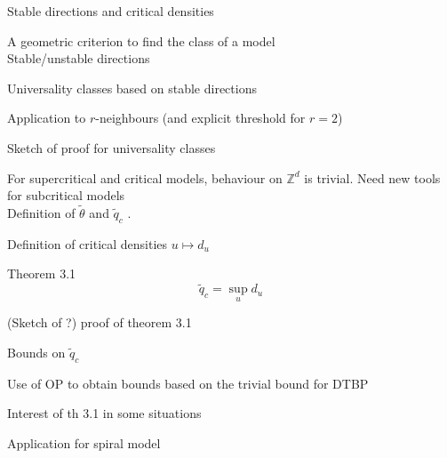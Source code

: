 \documentclass{beamer}
\begin{document}
\begin{section}{Stable directions and critical densities}
	\begin{frame}
		A geometric criterion to find the class of a model\\
		Stable/unstable directions\\
	\end{frame}
	\begin{frame}
		Universality classes based on stable directions
	\end{frame}
	\begin{frame}
		Application to $r$-neighbours (and explicit threshold for $r=2$)
	\end{frame}
	\begin{frame}
		Sketch of proof for universality classes
	\end{frame}
	\begin{frame}
		For supercritical and critical models, behaviour on $\mathbb{Z}^d$ is trivial. Need new tools for subcritical models\\
		Definition of $\tilde\theta $ and $  \tilde q_c $ .
	\end{frame}
	\begin{frame}
		Definition of critical densities $u\mapsto d_u$
	\end{frame}
	\begin{frame}
		\begin{theorem}{Theorem 3.1}
			$$\tilde q_c = \sup_u d_u$$
		\end{theorem}
	\end{frame}
	\begin{frame}
		(Sketch of ?) proof of theorem 3.1
	\end{frame}
	\begin{frame}
		Bounds on $\tilde q_c$
	\end{frame}
	\begin{frame}
		Use of OP to obtain bounds based on the trivial bound for DTBP
	\end{frame}
	\begin{frame}
		Interest of th 3.1 in some situations
	\end{frame}
	\begin{frame}
		Application for spiral model
	\end{frame}
\end{section}
\end{document}
